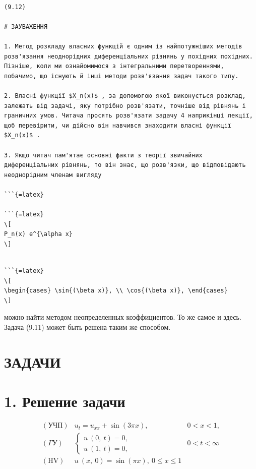 \documentclass[
]{article}
\begin{document}
\begin{verbatim}

(9.12)

# ЗАУВАЖЕННЯ

1. Метод розкладу власних функцій є одним із найпотужніших методів розв'язання неоднорідних диференціальних рівнянь у похідних похідних. Пізніше, коли ми ознайомимося з інтегральними перетвореннями, побачимо, що існують й інші методи розв'язання задач такого типу.

2. Власні функції $X_n(x)$ , за допомогою якої виконується розклад, залежать від задачі, яку потрібно розв'язати, точніше від рівнянь і граничних умов. Читача просять розв'язати задачу 4 наприкінці лекції, щоб перевірити, чи дійсно він навчився знаходити власні функції $X_n(x)$ .

3. Якщо читач пам'ятає основні факти з теорії звичайних диференціальних рівнянь, то він знає, що розв'язки, що відповідають неоднорідним членам вигляду

```{=latex}

```{=latex}
\[
P_n(x) e^{\alpha x}
\]
\end{verbatim}

\begin{verbatim}

```{=latex}
\[
\begin{cases} \sin{(\beta x)}, \\ \cos{(\beta x)}, \end{cases}
\]
\end{verbatim}

можно найти методом неопределенных коэффициентов. То же самое и здесь.
Задача (9.11) может быть решена таким же способом.

\section{ЗАДАЧИ}\label{ux437ux430ux434ux430ux447ux438}

\section{1. Решение
задачи}\label{ux440ux435ux448ux435ux43dux438ux435-ux437ux430ux434ux430ux447ux438}

\[
\begin{aligned} (\text{УЧП}) & u_t = u_{xx} + \sin{(3\pi x)}, & 0 < x < 1, \\ (\Gamma \text{У}) & \begin{cases} u \ (0, \ t) = 0, \\ u \ (1, \ t) = 0, \end{cases} & 0 < t < \infty \\ (\text{HV}) & u \ (x, \ 0) = \sin{(\pi x)}, \ 0 \leqslant x \leqslant 1 \end{aligned}
\]
\end{document}
